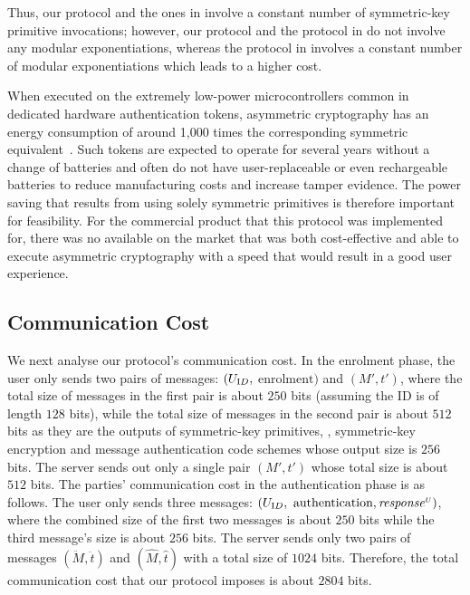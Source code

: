 Thus,  our protocol and the ones in \cite{WangW18,JareckiJKSS21,MatsuoMY11} involve a constant number of symmetric-key primitive invocations; however, our protocol and the protocol in \cite{MatsuoMY11} do not involve any modular exponentiations, whereas the protocol in  \cite{WangW18,JareckiJKSS21} involves a constant number of modular exponentiations which leads to a higher cost. 

When executed on the extremely low-power microcontrollers common in dedicated hardware authentication tokens, asymmetric cryptography has an energy consumption of around 1,000 times the corresponding symmetric equivalent~\cite{energyconsumption}.
Such tokens are expected to operate for several years without a change of batteries and often do not have user-replaceable or even rechargeable batteries to reduce manufacturing costs and increase tamper evidence.
The power saving that results from using solely symmetric primitives is therefore important for feasibility.
For the commercial product that this protocol was implemented for, there was no available on the market that was both cost-effective and able to execute asymmetric cryptography with a speed that would result in a good user experience.

\subsection{Communication Cost}


We next analyse our protocol's communication cost. In the enrolment phase,  the user only sends two pairs of messages: $(U_{\text ID}, $ $\text{enrolment})$ and $(M', t')$, where the total size of messages in the first pair is about $250$ bits (assuming the ID is of length $128$ bits),  while the total size of messages in the second pair is about  $512$ bits as they are the outputs of symmetric-key primitives, \ie, symmetric-key encryption and message authentication code schemes whose output size is $256$ bits. The server sends out only a single pair $(M', t')$ whose total size is about $512$ bits. 
% 
The parties' communication cost in the authentication phase is as follows. The user only sends three messages: $(U_{\text ID}, $ $\text{authentication}, \mathit{response}^{\scriptscriptstyle U})$, where the combined size of the first two messages is about $250$ bits while the third message's size is about $256$ bits. The server sends only two pairs of messages $(\ddot M, \ddot t)$ and $(\hat M, \hat t)$ with a total size of $1024$ bits. Therefore, the total communication cost that our protocol imposes is about $2804$ bits. 

